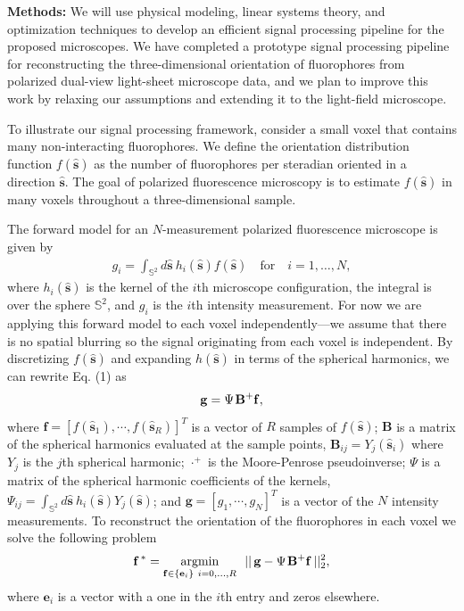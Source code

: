 \documentclass[11pt]{article}
\begin{document}
  \noindent\textbf{Methods:} We will use physical modeling, linear systems
  theory, and optimization techniques to develop an efficient signal processing
  pipeline for the proposed microscopes. We have completed a prototype signal
  processing pipeline for reconstructing the three-dimensional orientation of
  fluorophores from polarized dual-view light-sheet microscope data, and we plan
  to improve this work by relaxing our assumptions and extending it to the
  light-field microscope.

  To illustrate our signal processing framework, consider a small voxel that
  contains many non-interacting fluorophores. We define the orientation
  distribution function $f(\hat{\mathbf{s}})$ as the number of fluorophores per
  steradian oriented in a direction $\hat{\mathbf{s}}$. The goal of polarized
  fluorescence microscopy is to estimate $f(\hat{\mathbf{s}})$ in many voxels
  throughout a three-dimensional sample.
  
  The forward model for an $N$-measurement polarized fluorescence microscope is
  given by
\begin{align}
  g_i = \int_{\mathbb{S}^2}d\hat{\mathbf{s}}\ h_i(\hat{\mathbf{s}})f(\hat{\mathbf{s}})\hspace{1em}\text{for}\hspace{1em} i=1,\dotsc,N,
\end{align}
where $h_i(\hat{\mathbf{s}})$ is the kernel of the $i$th microscope
configuration, the integral is over the sphere $\mathbb{S}^2$, and $g_i$ is the
$i$th intensity measurement. For now we are applying this forward model to each
voxel independently---we assume that there is no spatial blurring so the signal
originating from each voxel is independent. By discretizing
$f(\hat{\mathbf{s}})$ and expanding $h(\hat{\mathbf{s}})$ in terms of the
spherical harmonics, we can rewrite Eq. (1) as
\begin{align}
  \mathbf{g} = \Psi\hspace{0.1em}\mathbf{B}^+\mathbf{f},
\end{align}
where $\mathbf{f} = [f(\hat{\mathbf{s}}_1), \cdots, f(\hat{\mathbf{s}}_R)]^T$ is
a vector of $R$ samples of $f(\hat{\mathbf{s}})$; $\mathbf{B}$ is a matrix of
the spherical harmonics evaluated at the sample points,
$\mathbf{B}_{ij} = Y_j(\hat{\mathbf{s}}_i)$ where $Y_j$ is the $j$th spherical
harmonic; $\cdot^+$ is the Moore-Penrose pseudoinverse; $\Psi$ is a matrix of
the spherical harmonic coefficients of the kernels,
$\Psi_{ij} = \int_{\mathbb{S}^2}d\hat{\textbf{s}}\
h_i(\hat{\mathbf{s}})Y_j(\hat{\mathbf{s}})$; and
$\mathbf{g} = [g_1, \cdots, g_N]^T$ is a vector of the $N$ intensity
measurements. To reconstruct the orientation of the fluorophores in each voxel
we solve the following problem
\begin{align}
\mathbf{f^{\thinspace *}}= \underset{\mathbf{f}\in\{\mathbf{e}_i\}\ i = 0,\dotsc,R}{\text{argmin}}
\ \ ||\thinspace\mathbf{g} - \Psi\hspace{0.1em}\mathbf{B}^+\mathbf{f}\thinspace||_2^2,
\end{align}
where $\mathbf{e}_i$ is a vector with a one in the $i$th entry and zeros
elsewhere.
\end{document}
